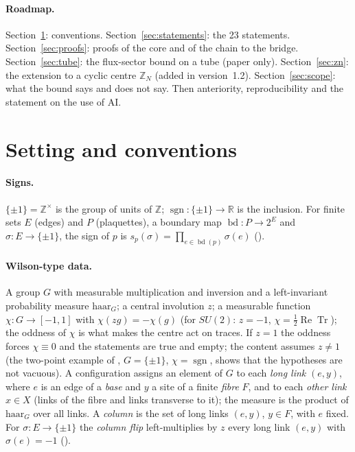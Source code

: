 \documentclass[11pt,a4paper]{article}
\theoremstyle{plain}
\theoremstyle{definition}
\theoremstyle{remark}
\numberwithin{equation}{section}
\newcommand{\R}{\mathbb{R}}
\newcommand{\Z}{\mathbb{Z}}
\newcommand{\Tr}{\operatorname{Tr}}
\newcommand{\lean}[1]{\texttt{\expandafter\leanbk\detokenize{#1}\relax}}
\def\leanbk#1{\ifx#1\relax\else\ifx#1.#1\allowbreak\else\ifx#1_#1\allowbreak\else#1\fi\fi\expandafter\leanbk\fi}
\begin{document}
\paragraph{Roadmap.} Section~\ref{sec:setting}: conventions. Section~\ref{sec:statements}: the 23 statements. Section~\ref{sec:proofs}: proofs of the core and of the chain to the bridge. Section~\ref{sec:tube}: the flux-sector bound on a tube (paper only). Section~\ref{sec:zn}: the extension to a cyclic centre $\mathbb Z_N$ (added in version~1.2). Section~\ref{sec:scope}: what the bound says and does not say. Then anteriority, reproducibility and the statement on the use of AI.

\section{Setting and conventions}\label{sec:setting}
\paragraph{Signs.} $\{\pm1\}=\mathbb Z^\times$ is the group of units of $\Z$; $\operatorname{sgn}:\{\pm1\}\to\R$ is the inclusion. For finite sets $E$ (edges) and $P$ (plaquettes), a boundary map $\operatorname{bd}:P\to2^E$ and $\sigma:E\to\{\pm1\}$, the sign of $p$ is $s_p(\sigma)=\prod_{e\in\operatorname{bd}(p)}\sigma(e)$ (\lean{plaq}).

\paragraph{Wilson-type data.} A group $G$ with measurable multiplication and inversion and a left-invariant probability measure $\mathrm{haar}_G$; a central involution $z$; a measurable function $\chi:G\to[-1,1]$ with $\chi(zg)=-\chi(g)$ (for $SU(2)$: $z=-1$, $\chi=\frac12\operatorname{Re}\Tr$); the oddness of $\chi$ is what makes the centre act on traces. If $z=1$ the oddness forces $\chi\equiv0$ and the statements are true and empty; the content assumes $z\ne1$ (the two-point example of \lean{sharp_one_edge}, $G=\{\pm1\}$, $\chi=\operatorname{sgn}$, shows that the hypotheses are not vacuous). A configuration assigns an element of $G$ to each \emph{long link} $(e,y)$, where $e$ is an edge of a \emph{base} and $y$ a site of a finite \emph{fibre} $F$, and to each \emph{other link} $x\in X$ (links of the fibre and links transverse to it); the measure is the product of $\mathrm{haar}_G$ over all links. A \emph{column} is the set of long links $(e,y)$, $y\in F$, with $e$ fixed. For $\sigma:E\to\{\pm1\}$ the \emph{column flip} left-multiplies by $z$ every long link $(e,y)$ with $\sigma(e)=-1$ (\lean{columnFlip}).
\end{document}
